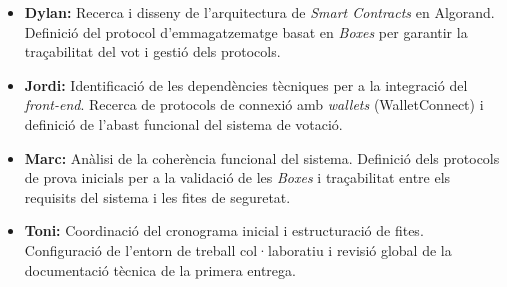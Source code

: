 \begin{itemize}
    \item \textbf{Dylan:} Recerca i disseny de l'arquitectura de \textit{Smart Contracts} en Algorand. Definició del protocol d'emmagatzematge basat en \textit{Boxes} per garantir la traçabilitat del vot i gestió dels protocols.
    
    \item \textbf{Jordi:} Identificació de les dependències tècniques per a la integració del \textit{front-end}. Recerca de protocols de connexió amb \textit{wallets} (WalletConnect) i definició de l'abast funcional del sistema de votació.
    
    \item \textbf{Marc:} Anàlisi de la coherència funcional del sistema. Definició dels protocols de prova inicials per a la validació de les \textit{Boxes} i traçabilitat entre els requisits del sistema i les fites de seguretat.
    
    \item \textbf{Toni:} Coordinació del cronograma inicial i estructuració de fites. Configuració de l'entorn de treball col·laboratiu i revisió global de la documentació tècnica de la primera entrega.
\end{itemize}
